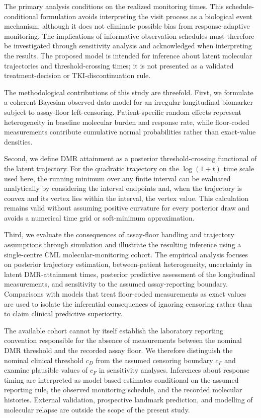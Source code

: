 \documentclass[11pt]{article}
\begin{document}
The primary analysis conditions on the realized monitoring times. This schedule-conditional formulation avoids interpreting the visit process as a biological event mechanism, although it does not eliminate possible bias from response-adaptive monitoring. The implications of informative observation schedules must therefore be investigated through sensitivity analysis and acknowledged when interpreting the results. The proposed model is intended for inference about latent molecular trajectories and threshold-crossing times; it is not presented as a validated treatment-decision or TKI-discontinuation rule.

The methodological contributions of this study are threefold. First, we formulate a coherent Bayesian observed-data model for an irregular longitudinal biomarker subject to assay-floor left-censoring. Patient-specific random effects represent heterogeneity in baseline molecular burden and response rate, while floor-coded measurements contribute cumulative normal probabilities rather than exact-value densities.

Second, we define DMR attainment as a posterior threshold-crossing functional of the latent trajectory. For the quadratic trajectory on the $\log(1+t)$ time scale used here, the running minimum over any finite interval can be evaluated analytically by considering the interval endpoints and, when the trajectory is convex and its vertex lies within the interval, the vertex value. This calculation remains valid without assuming positive curvature for every posterior draw and avoids a numerical time grid or soft-minimum approximation.

Third, we evaluate the consequences of assay-floor handling and trajectory assumptions through simulation and illustrate the resulting inference using a single-centre CML molecular-monitoring cohort. The empirical analysis focuses on posterior trajectory estimation, between-patient heterogeneity, uncertainty in latent DMR-attainment times, posterior predictive assessment of the longitudinal measurements, and sensitivity to the assumed assay-reporting boundary. Comparisons with models that treat floor-coded measurements as exact values are used to isolate the inferential consequences of ignoring censoring rather than to claim clinical predictive superiority.

The available cohort cannot by itself establish the laboratory reporting convention responsible for the absence of measurements between the nominal DMR threshold and the recorded assay floor. We therefore distinguish the nominal clinical threshold $c_D$ from the assumed censoring boundary $c_F$ and examine plausible values of $c_F$ in sensitivity analyses. Inferences about response timing are interpreted as model-based estimates conditional on the assumed reporting rule, the observed monitoring schedule, and the recorded molecular histories. External validation, prospective landmark prediction, and modelling of molecular relapse are outside the scope of the present study.
\end{document}
